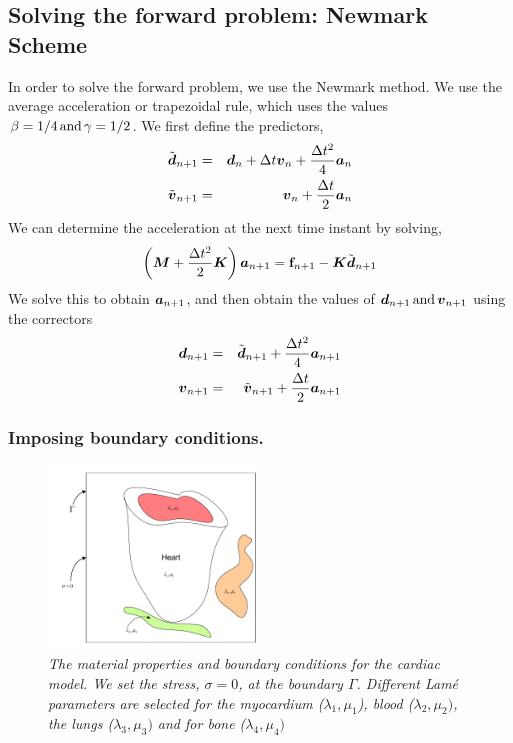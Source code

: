 \subsection{Solving the forward problem: Newmark Scheme}

In order to solve the forward problem, we use the Newmark method. We use the
average acceleration or trapezoidal rule, which uses the values $\beta = 1 / 4
\operatorname{and} \gamma = 1 / 2$. We first define the predictors,
\begin{eqnarray}
  \tilde{\boldsymbol{d}}_{n + 1} & = & \boldsymbol{d}_n + \Delta t\boldsymbol{v}_n +
  \frac{\Delta t^2}{4} \boldsymbol{a}_n \nonumber\\
  \tilde{\boldsymbol{v}}_{n + 1} & = & \boldsymbol{v}_n + \frac{\Delta t}{2}
  \boldsymbol{a}_n 
\end{eqnarray}
We can determine the acceleration at the next time instant by solving,
\begin{equation}
  \left( \boldsymbol{M}+ \frac{\Delta t^2}{2} \boldsymbol{K} \right)
  \boldsymbol{a}_{n + 1} =\mathbf{f}_{n + 1} -\boldsymbol{K}
  \tilde{\boldsymbol{d}}_{n + 1}
\end{equation}
We solve this to obtain $\boldsymbol{a}_{n + 1}$, and then obtain the values of
$\boldsymbol{d}_{n + 1} \operatorname{and} \boldsymbol{v}_{n + 1}$ using the correctors
\begin{eqnarray}
  \boldsymbol{d}_{n + 1} & = & \tilde{\boldsymbol{d}}_{n + 1} + \frac{\Delta
  t^2}{4} \boldsymbol{a}_{n + 1} \nonumber\\
  \boldsymbol{v}_{n + 1} & = & \tilde{\boldsymbol{v}}_{n + 1} + \frac{\Delta t}{2}
  \boldsymbol{a}_{n + 1} 
\end{eqnarray}

\subsubsection{Imposing boundary conditions.} 

\begin{figure}
  \centering  
  \includegraphics[width=0.5\textwidth]{images/mat_prop}
  \caption{\em \small The material properties and boundary conditions for the cardiac model. We set the stress, $\sigma = 0$, at the boundary $\Gamma$. Different Lam\'{e}  parameters are selected for the myocardium ($\lambda_1, \mu_1$), blood ($\lambda_2, \mu_2)$, the lungs ($\lambda_3, \mu_3)$ and for bone ($\lambda_4, \mu_4)$ }
 \label{matprop}
\end{figure}	

